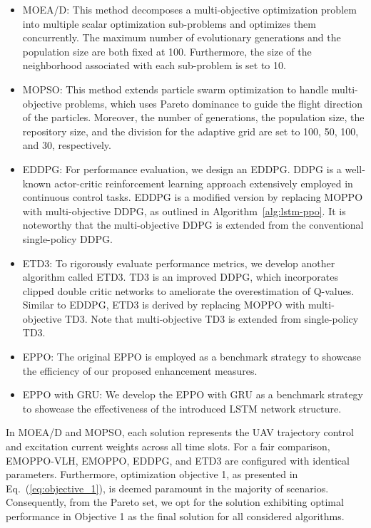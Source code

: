 \documentclass[10pt,journal,compsoc]{IEEEtran}
\begin{document}
\begin{itemize}
    
    \item MOEA/D: This method decomposes a multi-objective optimization problem into multiple scalar optimization sub-problems and optimizes them concurrently. The maximum number of evolutionary generations and the population size are both fixed at 100. Furthermore, the size of the neighborhood associated with each sub-problem is set to 10.

    \item MOPSO: This method extends particle swarm optimization to handle multi-objective problems, which uses Pareto dominance to guide the flight direction of the particles. Moreover, the number of generations, the population size, the repository size, and the division for the adaptive grid are set to 100, 50, 100, and 30, respectively.

    \item EDDPG: For performance evaluation, we design an EDDPG. DDPG is a well-known actor-critic reinforcement learning approach extensively employed in continuous control tasks. EDDPG is a modified version by replacing MOPPO with multi-objective DDPG, as outlined in Algorithm~\ref{alg:lstm-ppo}. It is noteworthy that the multi-objective DDPG is extended from the conventional single-policy DDPG.

    \item ETD3: To rigorously evaluate performance metrics, we develop another algorithm called ETD3. TD3 is an improved DDPG, which incorporates clipped double critic networks to ameliorate the overestimation of Q-values. Similar to EDDPG, ETD3 is derived by replacing MOPPO with multi-objective TD3. Note that multi-objective TD3 is extended from single-policy TD3.

    \item EPPO: The original EPPO is employed as a benchmark strategy to showcase the efficiency of our proposed enhancement measures.

    \item EPPO with GRU: We develop the EPPO with GRU as a benchmark strategy to showcase the effectiveness of the introduced LSTM network structure.

\end{itemize}

\par In MOEA/D and MOPSO, each solution represents the UAV trajectory control and excitation current weights across all time slots. For a fair comparison, EMOPPO-VLH, EMOPPO, EDDPG, and ETD3 are configured with identical parameters. Furthermore, optimization objective 1, as presented in Eq.~(\ref{eq:objective_1}), is deemed paramount in the majority of scenarios. Consequently, from the Pareto set, we opt for the solution exhibiting optimal performance in Objective 1 as the final solution for all considered algorithms.
\end{document}
